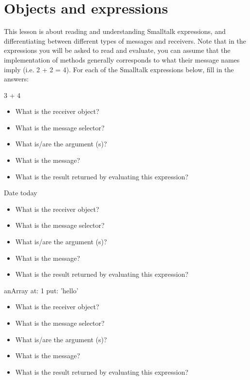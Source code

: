 \ifx\wholebook\relax\else


\fi

\chapter{Objects and expressions}

This lesson is about reading and understanding Smalltalk expressions, and differentiating between different types of messages and receivers.
Note that in the expressions you will be asked to read and evaluate, you can assume that the implementation of methods generally corresponds to what their message names imply (i.e. 2 + 2 = 4).
\exercise For each of the Smalltalk expressions below, fill in the answers:

\begin{code}
3 + 4
\end{code}
\begin{itemize}
\item What is the receiver object?  
\item What is the message selector?  
\item What is/are the argument (s)? 
\item What is the message? 
\item What is the result returned by evaluating this expression? 
\end{itemize}

\begin{code}
Date today
\end{code}
\begin{itemize}
\item What is the receiver object? 
\item What is the message selector? 
\item What is/are the argument (s)? 
\item What is the message? 
\item What is the result returned by evaluating this expression?
\end{itemize}

\begin{code}
anArray at: 1 put: 'hello'
\end{code}

\begin{itemize}
\item What is the receiver object? 
\item What is the message selector? 
\item What is/are the argument (s)? 
\item What is the message? 
\item What is the result returned by evaluating this expression?
\end{itemize}

